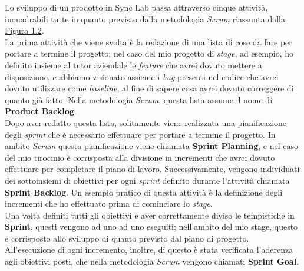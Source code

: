 Lo sviluppo di un prodotto in Sync Lab passa attraverso cinque attività, inquadrabili tutte in quanto previsto dalla metodologia \textit{Scrum} riassunta dalla \hyperref[img:scrum]{Figura 1.2}. \\
La prima attività che viene svolta è la redazione di una lista di cose da fare per portare a termine il progetto; nel caso del mio progetto di \textit{stage}, ad esempio, ho definito insieme al tutor aziendale le \textit{feature} che avrei dovuto mettere a disposizione, e abbiamo visionato assieme i \textit{bug} presenti nel codice che avrei dovuto utilizzare come \textit{baseline}, al fine di sapere cosa avrei dovuto correggere di quanto già fatto. Nella metodologia \textit{Scrum}, questa lista assume il nome di \textbf{Product Backlog}. \\
Dopo aver redatto questa lista, solitamente viene realizzata una pianificazione degli \textit{sprint} che è necessario effettuare per portare a termine il progetto. In ambito \textit{Scrum} questa pianificazione viene chiamata \textbf{Sprint Planning}, e nel caso del mio tirocinio è corrisposta alla divisione in incrementi che avrei dovuto effettuare per completare il piano di lavoro. Successivamente, vengono individuati dei sottoinsiemi di obiettivi per ogni \textit{sprint} definito durante l'attività chiamata \textbf{Sprint Backlog}. Un esempio pratico di questa attività è la definizione degli incrementi che ho effettuato prima di cominciare lo \textit{stage}. \\
Una volta definiti tutti gli obiettivi e aver correttamente diviso le tempistiche in \textbf{Sprint}, questi vengono ad uno ad uno eseguiti; nell'ambito del mio stage, questo è corrisposto allo sviluppo di quanto previsto dal piano di progetto. All'esecuzione di ogni incremento, inoltre, di questo è stata verificata l'aderenza agli obiettivi posti, che nella metodologia \textit{Scrum} vengono chiamati \textbf{Sprint Goal}.

